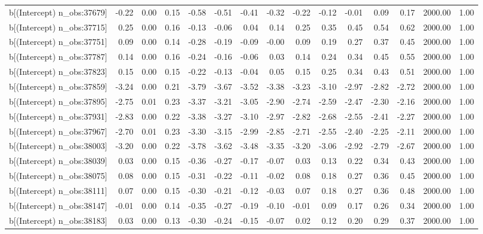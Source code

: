\begin{table}[ht]
\begin{tabular}{rrrrrrrrrrrrrrr}
  b[(Intercept) n\_obs:37679] & -0.22 & 0.00 & 0.15 & -0.58 & -0.51 & -0.41 & -0.32 & -0.22 & -0.12 & -0.01 & 0.09 & 0.17 & 2000.00 & 1.00 \\ 
  b[(Intercept) n\_obs:37715] & 0.25 & 0.00 & 0.16 & -0.13 & -0.06 & 0.04 & 0.14 & 0.25 & 0.35 & 0.45 & 0.54 & 0.62 & 2000.00 & 1.00 \\ 
  b[(Intercept) n\_obs:37751] & 0.09 & 0.00 & 0.14 & -0.28 & -0.19 & -0.09 & -0.00 & 0.09 & 0.19 & 0.27 & 0.37 & 0.45 & 2000.00 & 1.00 \\ 
  b[(Intercept) n\_obs:37787] & 0.14 & 0.00 & 0.16 & -0.24 & -0.16 & -0.06 & 0.03 & 0.14 & 0.24 & 0.34 & 0.45 & 0.55 & 2000.00 & 1.00 \\ 
  b[(Intercept) n\_obs:37823] & 0.15 & 0.00 & 0.15 & -0.22 & -0.13 & -0.04 & 0.05 & 0.15 & 0.25 & 0.34 & 0.43 & 0.51 & 2000.00 & 1.00 \\ 
  b[(Intercept) n\_obs:37859] & -3.24 & 0.00 & 0.21 & -3.79 & -3.67 & -3.52 & -3.38 & -3.23 & -3.10 & -2.97 & -2.82 & -2.72 & 2000.00 & 1.00 \\ 
  b[(Intercept) n\_obs:37895] & -2.75 & 0.01 & 0.23 & -3.37 & -3.21 & -3.05 & -2.90 & -2.74 & -2.59 & -2.47 & -2.30 & -2.16 & 2000.00 & 1.00 \\ 
  b[(Intercept) n\_obs:37931] & -2.83 & 0.00 & 0.22 & -3.38 & -3.27 & -3.10 & -2.97 & -2.82 & -2.68 & -2.55 & -2.41 & -2.27 & 2000.00 & 1.00 \\ 
  b[(Intercept) n\_obs:37967] & -2.70 & 0.01 & 0.23 & -3.30 & -3.15 & -2.99 & -2.85 & -2.71 & -2.55 & -2.40 & -2.25 & -2.11 & 2000.00 & 1.00 \\ 
  b[(Intercept) n\_obs:38003] & -3.20 & 0.00 & 0.22 & -3.78 & -3.62 & -3.48 & -3.35 & -3.20 & -3.06 & -2.92 & -2.79 & -2.67 & 2000.00 & 1.00 \\ 
  b[(Intercept) n\_obs:38039] & 0.03 & 0.00 & 0.15 & -0.36 & -0.27 & -0.17 & -0.07 & 0.03 & 0.13 & 0.22 & 0.34 & 0.43 & 2000.00 & 1.00 \\ 
  b[(Intercept) n\_obs:38075] & 0.08 & 0.00 & 0.15 & -0.31 & -0.22 & -0.11 & -0.02 & 0.08 & 0.18 & 0.27 & 0.36 & 0.45 & 2000.00 & 1.00 \\ 
  b[(Intercept) n\_obs:38111] & 0.07 & 0.00 & 0.15 & -0.30 & -0.21 & -0.12 & -0.03 & 0.07 & 0.18 & 0.27 & 0.36 & 0.48 & 2000.00 & 1.00 \\ 
  b[(Intercept) n\_obs:38147] & -0.01 & 0.00 & 0.14 & -0.35 & -0.27 & -0.19 & -0.10 & -0.01 & 0.09 & 0.17 & 0.26 & 0.34 & 2000.00 & 1.00 \\ 
  b[(Intercept) n\_obs:38183] & 0.03 & 0.00 & 0.13 & -0.30 & -0.24 & -0.15 & -0.07 & 0.02 & 0.12 & 0.20 & 0.29 & 0.37 & 2000.00 & 1.00 \\ 

\end{tabular}
\end{table}
